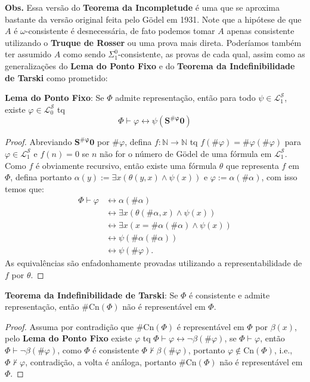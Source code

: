 \documentclass[11pt]{article}
\newcommand{\mc}[1]{\mathcal{#1}}
\newcommand{\mbb}[1]{\mathbb{#1}}
\begin{document}
\begin{shaded}
\textbf{Obs.} Essa versão do \textbf{Teorema da Incompletude} é uma que se aproxima bastante da versão original feita pelo Gödel em 1931. Note que a hipótese de que $A$ é $\omega$-consistente é desnecessária, de fato podemos tomar $A$ apenas consistente utilizando o \textbf{Truque de Rosser} ou uma prova mais direta. Poderíamos também ter assumido $A$ como sendo $\Sigma_1^0$-consistente, as provas de cada qual, assim como as generalizações do \textbf{Lema do Ponto Fixo} e do \textbf{Teorema da Indefinibilidade de Tarski} como prometido:

\textbf{Lema do Ponto Fixo}: Se $\Phi$ admite representação, então para todo $\psi\in\mc{L}_1^\mc{S}$, existe $\varphi\in\mc{L}_0^\mc{S}$ tq
$$\Phi\vdash\varphi\leftrightarrow\psi(\mathbf{S^{\#\varphi}0})$$
\begin{proof}
    Abreviando $\mathbf{S^{\#\varphi}0}$ por $\#\varphi$, defina $f:\mbb{N}\to\mbb{N}$ tq $f(\#\varphi)=\#\varphi(\#\varphi)$ para $\varphi\in\mc{L}_1^\mc{S}$ e $f(n)=0$ se $n$ não for o número de Gödel de uma fórmula em $\mc{L}_1^\mc{S}$. Como $f$ é obviamente recursivo, então existe uma fórmula $\theta$ que representa $f$ em $\Phi$, defina portanto $\alpha(y):=\exists x(\theta(y,x)\wedge\psi(x))$ e $\varphi:=\alpha(\#\alpha)$, com isso temos que:
    \begin{align*}
        \Phi\vdash\varphi & \leftrightarrow \alpha(\#\alpha)\\
        & \leftrightarrow \exists x(\theta(\#\alpha,x)\wedge\psi(x))\\
        & \leftrightarrow \exists x(x=\#\alpha(\#\alpha)\wedge\psi(x))\\
        & \leftrightarrow \psi(\#\alpha(\#\alpha))\\
        & \leftrightarrow \psi(\#\varphi).
    \end{align*}
    As equivalências são enfadonhamente provadas utilizando a representabilidade de $f$ por $\theta$.
\end{proof}

\textbf{Teorema da Indefinibilidade de Tarski}: Se $\Phi$ é consistente e admite representação, então $\#\text{Cn}(\Phi)$ não é representável em $\Phi$.
\begin{proof}
    Assuma por contradição que $\#\text{Cn}(\Phi)$ é representável em $\Phi$ por $\beta(x)$, pelo \textbf{Lema do Ponto Fixo} existe $\varphi$ tq $\Phi\vdash\varphi\leftrightarrow\neg\beta(\#\varphi)$, se $\Phi\vdash\varphi$, então $\Phi\vdash\neg\beta(\#\varphi)$, como $\Phi$ é consistente $\Phi\nvdash\beta(\#\varphi)$, portanto $\varphi\notin\text{Cn}(\Phi)$, i.e., $\Phi\nvdash\varphi$, contradição, a volta é análoga, portanto $\#\text{Cn}(\Phi)$ não é representável em $\Phi$.
\end{proof}


\end{shaded}
\end{document}
